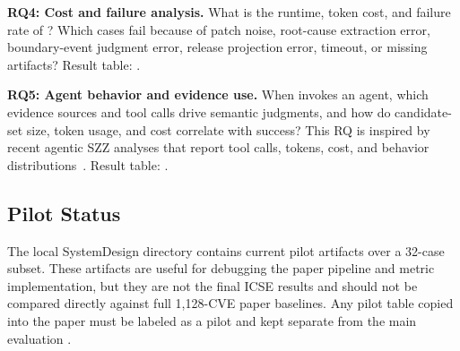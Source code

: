 \textbf{RQ4: Cost and failure analysis.} What is the runtime, token cost, and failure rate of \toolname? Which cases fail because of patch noise, root-cause extraction error, boundary-event judgment error, release projection error, timeout, or missing artifacts? Result table: .

\textbf{RQ5: Agent behavior and evidence use.} When \toolname invokes an agent, which evidence sources and tool calls drive semantic judgments, and how do candidate-set size, token usage, and cost correlate with success? This RQ is inspired by recent agentic SZZ analyses that report tool calls, tokens, cost, and behavior distributions~\cite{agentszz2026,howwhyagents2026}. Result table: .

\subsection{Pilot Status}

The local SystemDesign directory contains current pilot artifacts over a 32-case subset. These artifacts are useful for debugging the paper pipeline and metric implementation, but they are not the final ICSE results and should not be compared directly against full 1,128-CVE paper baselines. Any pilot table copied into the paper must be labeled as a pilot and kept separate from the main evaluation .
